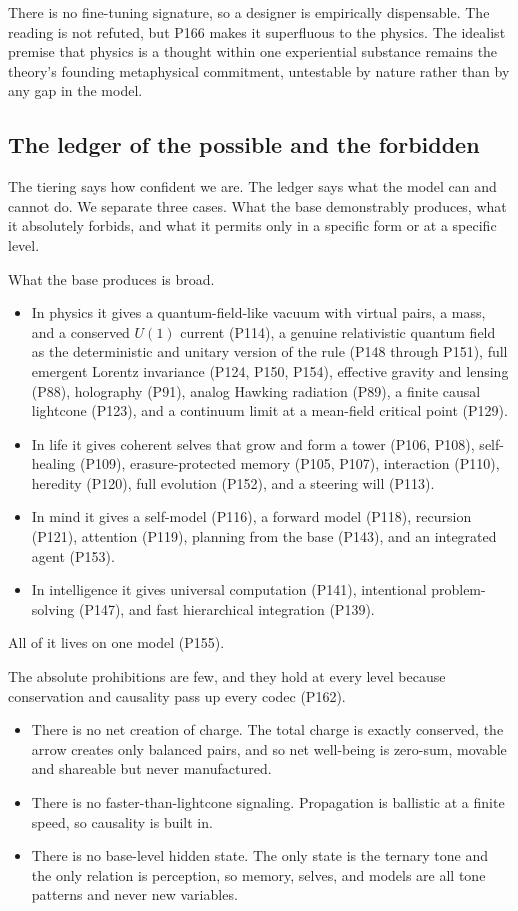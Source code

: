 There is
no fine-tuning signature, so a designer is empirically dispensable. The reading is not refuted, but P166 makes
it superfluous to the physics. The idealist premise that physics is a thought within one experiential
substance remains the theory's founding metaphysical commitment, untestable by nature rather than by any gap
in the model.

\subsection{The ledger of the possible and the forbidden}

The tiering says how confident we are. The ledger says what the model can and cannot do. We separate three
cases. What the base demonstrably produces, what it absolutely forbids, and what it permits only in a specific
form or at a specific level.

What the base produces is broad.

\begin{itemize}
\item In physics it gives a quantum-field-like vacuum with virtual pairs, a mass,
and a conserved $U(1)$ current (P114), a genuine relativistic quantum field as the deterministic and unitary
version of the rule (P148 through P151), full emergent Lorentz invariance (P124, P150, P154), effective
gravity and lensing (P88), holography (P91), analog Hawking radiation (P89), a finite causal lightcone (P123),
and a continuum limit at a mean-field critical point (P129).
\item In life it gives coherent selves that grow and
form a tower (P106, P108), self-healing (P109), erasure-protected memory (P105, P107), interaction (P110),
heredity (P120), full evolution (P152), and a steering will (P113).
\item In mind it gives a self-model (P116), a
forward model (P118), recursion (P121), attention (P119), planning from the base (P143), and an integrated
agent (P153).
\item In intelligence it gives universal computation (P141), intentional problem-solving (P147), and
fast hierarchical integration (P139).
\end{itemize}

All of it lives on one model (P155).

The absolute prohibitions are few, and they hold at every level because conservation and causality pass up
every codec (P162).

\begin{itemize}
\item There is no net creation of charge. The total charge is exactly conserved, the arrow
creates only balanced pairs, and so net well-being is zero-sum, movable and shareable but never manufactured.
\item There is no faster-than-lightcone signaling. Propagation is ballistic at a finite speed, so causality is built
in.
\item There is no base-level hidden state. The only state is the ternary tone and the only relation is
perception, so memory, selves, and models are all tone patterns and never new variables.
\end{itemize}

